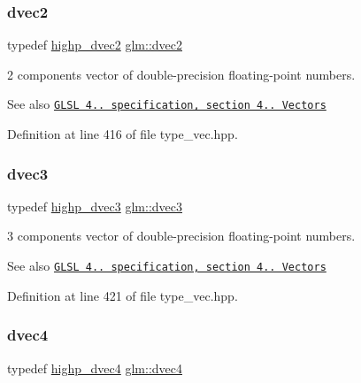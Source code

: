 \subsubsection{\texorpdfstring{dvec2}{dvec2}}
{\footnotesize\ttfamily typedef \hyperlink{group__core__precision_gacfbe8512142fff27f0bfb44958c1752f}{highp\+\_\+dvec2} \hyperlink{group__core__types_gae6727259898288cae197724d5f172b3b}{glm\+::dvec2}}

2 components vector of double-\/precision floating-\/point numbers.

\begin{DoxySeeAlso}{See also}
\href{http://www.opengl.org/registry/doc/GLSLangSpec.4.20.8.pdf}{\tt G\+L\+SL 4.. specification, section 4.. Vectors} 
\end{DoxySeeAlso}


Definition at line 416 of file type\+\_\+vec.\+hpp.

\mbox{\label{group__core__types_ga7f3287f952e6ccb481231368091702ac}} 
\subsubsection{\texorpdfstring{dvec3}{dvec3}}
{\footnotesize\ttfamily typedef \hyperlink{group__core__precision_ga4962711854156dae8ebb4eb39237c542}{highp\+\_\+dvec3} \hyperlink{group__core__types_ga7f3287f952e6ccb481231368091702ac}{glm\+::dvec3}}

3 components vector of double-\/precision floating-\/point numbers.

\begin{DoxySeeAlso}{See also}
\href{http://www.opengl.org/registry/doc/GLSLangSpec.4.20.8.pdf}{\tt G\+L\+SL 4.. specification, section 4.. Vectors} 
\end{DoxySeeAlso}


Definition at line 421 of file type\+\_\+vec.\+hpp.

\mbox{\label{group__core__types_ga0824ceed7ec3b2fba89765501c1540b5}} 
\subsubsection{\texorpdfstring{dvec4}{dvec4}}
{\footnotesize\ttfamily typedef \hyperlink{group__core__precision_gad5ff5ff4a69e6925f5b4f540e2633835}{highp\+\_\+dvec4} \hyperlink{group__core__types_ga0824ceed7ec3b2fba89765501c1540b5}{glm\+::dvec4}}

